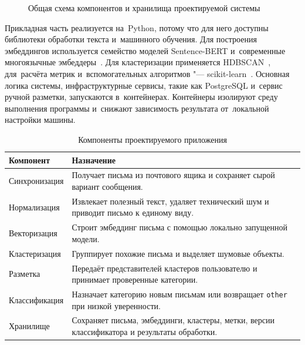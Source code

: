 \begin{figure}[htbp]
    \centering
    \resizebox{\textwidth}{!}{%
    }
    \caption{Общая схема компонентов и хранилища проектируемой системы}\label{fig:ch2/architecture}
\end{figure}
\FloatBarrier

Прикладная часть реализуется на~Python, потому что для него доступны
библиотеки обработки текста и~машинного обучения. Для построения эмбеддингов
используется семейство моделей Sentence-BERT и~современные многоязычные
эмбеддеры~\autocite{Reimers2019SBERT,Reimers2020MultilingualSBERT,Chen2024BGEM3}.
Для кластеризации применяется HDBSCAN~\autocite{McInnes2017HDBSCAN}, для~расчёта
метрик и~вспомогательных алгоритмов "--- scikit-learn~\autocite{Pedregosa2011sklearn}.
Основная логика системы, инфраструктурные сервисы, такие как PostgreSQL и~сервис
ручной разметки, запускаются в~контейнерах. Контейнеры изолируют среду выполнения
программы и~снижают зависимость результата от~локальной настройки машины.

\begin{table}[htbp]
    \centering
    \caption{Компоненты проектируемого приложения}\label{tab:ch2/components}
    \begin{tabular}{@{}p{}p{}@{}}
        \toprule
        Компонент & Назначение \\
        \midrule
        Синхронизация & Получает письма из почтового ящика и сохраняет сырой
        вариант сообщения. \\
        Нормализация & Извлекает полезный текст, удаляет технический шум и
        приводит письмо к единому виду. \\
        Векторизация & Строит эмбеддинг письма с помощью локально запущенной
        модели. \\
        Кластеризация & Группирует похожие письма и выделяет шумовые объекты. \\
        Разметка & Передаёт представителей кластеров пользователю и принимает
        проверенные категории. \\
        Классификация & Назначает категорию новым письмам или возвращает
        \texttt{other} при низкой уверенности. \\
        Хранилище & Сохраняет письма, эмбеддинги, кластеры, метки, версии
        классификатора и результаты обработки. \\
        \bottomrule
    \end{tabular}
\end{table}
\FloatBarrier

